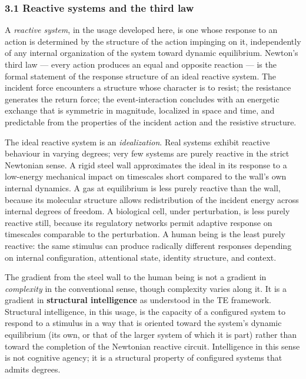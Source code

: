 \documentclass[
  11pt,
  a4paper,
]{article}
\begin{document}
\subsubsection{3.1 Reactive systems and the third
law}\label{reactive-systems-and-the-third-law}

A \emph{reactive system}, in the usage developed here, is one whose
response to an action is determined by the structure of the action
impinging on it, independently of any internal organization of the
system toward dynamic equilibrium. Newton's third law --- every action
produces an equal and opposite reaction --- is the formal statement of
the response structure of an ideal reactive system. The incident force
encounters a structure whose character is to resist; the resistance
generates the return force; the event-interaction concludes with an
energetic exchange that is symmetric in magnitude, localized in space
and time, and predictable from the properties of the incident action and
the resistive structure.

The ideal reactive system is an \emph{idealization}. Real systems
exhibit reactive behaviour in varying degrees; very few systems are
purely reactive in the strict Newtonian sense. A rigid steel wall
approximates the ideal in its response to a low-energy mechanical impact
on timescales short compared to the wall's own internal dynamics. A gas
at equilibrium is less purely reactive than the wall, because its
molecular structure allows redistribution of the incident energy across
internal degrees of freedom. A biological cell, under perturbation, is
less purely reactive still, because its regulatory networks permit
adaptive response on timescales comparable to the perturbation. A human
being is the least purely reactive: the same stimulus can produce
radically different responses depending on internal configuration,
attentional state, identity structure, and context.

The gradient from the steel wall to the human being is not a gradient in
\emph{complexity} in the conventional sense, though complexity varies
along it. It is a gradient in \textbf{structural intelligence} as
understood in the TE framework. Structural intelligence, in this usage,
is the capacity of a configured system to respond to a stimulus in a way
that is oriented toward the system's dynamic equilibrium (its own, or
that of the larger system of which it is part) rather than toward the
completion of the Newtonian reactive circuit. Intelligence in this sense
is not cognitive agency; it is a structural property of configured
systems that admits degrees.
\end{document}
